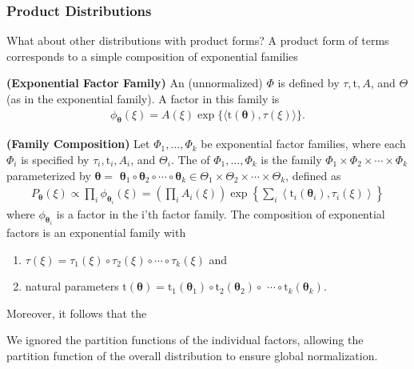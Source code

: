 \documentclass{article}
\newcommand{\bfs}[1]{\textbf{({#1}) }}
\begin{document}
\subsubsection{Product Distributions}
What about other distributions with product forms? A product form of terms corresponds to a simple composition of exponential families
\begin{defa}\bfs{Exponential Factor Family}
An (unnormalized)  $\Phi$ is defined by $\tau, \mathrm{t}, A$, and $\Theta$ (as in the exponential family). A factor in this family is
\begin{align*}
\phi_{\boldsymbol{\theta}}(\xi)=A(\xi) \exp \{\langle\mathrm{t}(\boldsymbol{\theta}), \tau(\xi)\rangle\} .
\end{align*}
\end{defa}
\begin{defa}\bfs{Family Composition}
Let $\Phi_{1}, \ldots, \Phi_{k}$ be exponential factor families, where each $\Phi_{i}$ is specified by $\tau_{i}, \mathrm{t}_{i}, A_{i}$, and $\Theta_{i}$. The  of $\Phi_{1}, \ldots, \Phi_{k}$ is the family $\Phi_{1} \times \Phi_{2} \times \cdots \times \Phi_{k}$ parameterized by $\boldsymbol{\theta}=$ $\boldsymbol{\theta}_{1} \circ \boldsymbol{\theta}_{2} \circ \cdots \circ \boldsymbol{\theta}_{k} \in \Theta_{1} \times \Theta_{2} \times \cdots \times \Theta_{k}$, defined as
\begin{align*}
P_{\boldsymbol{\theta}}(\xi) \propto \prod_{i} \phi_{\boldsymbol{\theta}_{i}}(\xi)=\left(\prod_{i} A_{i}(\xi)\right) \exp \left\{\sum_{i}\left\langle\mathrm{t}_{i}\left(\boldsymbol{\theta}_{i}\right), \tau_{i}(\xi)\right\rangle\right\}
\end{align*}
where $\phi_{\boldsymbol{\theta}_{i}}$ is a factor in the i'th factor family. The composition of exponential factors is an exponential family with
\begin{enumerate}
    \item $\tau(\xi)=\tau_{1}(\xi) \circ \tau_{2}(\xi) \circ \cdots \circ \tau_{k}(\xi)$ and 
    \item natural parameters $\mathrm{t}(\boldsymbol{\theta})=\mathrm{t}_{1}\left(\boldsymbol{\theta}_{1}\right) \circ \mathrm{t}_{2}\left(\boldsymbol{\theta}_{2}\right) \circ$ $\cdots \circ \mathrm{t}_{k}\left(\boldsymbol{\theta}_{k}\right)$.
\end{enumerate}
\end{defa}
\begin{rema}
Moreover, it follows that the 
\end{rema}
\begin{rema}
We ignored the partition functions of the individual factors, allowing the partition function of the overall distribution to ensure global normalization.
\end{rema}
\end{document}
